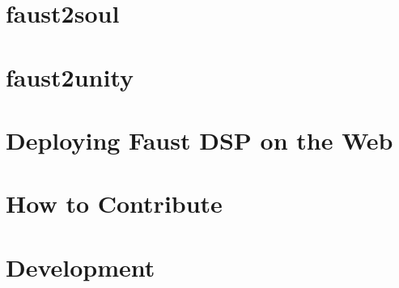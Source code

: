 \let\mypdfximage\pdfximage\def\pdfximage{\immediate\mypdfximage}\documentclass[twoside]{book}
\newcommand{\+}{\discretionary{\mbox{\scriptsize$\hookleftarrow$}}{}{}}
\begin{document}
\chapter{faust2soul}
\label{md__c_1__users_fab_src__github_branches__neural_amp_modeler_plugin_i_plug2__dependencies__build_39cb87a85a361f4c5993f8dacba43324}

\chapter{faust2unity}
\label{md__c_1__users_fab_src__github_branches__neural_amp_modeler_plugin_i_plug2__dependencies__build_186c879abe1e60a5c1ce38c0ccdd1e10}

\chapter{Deploying Faust D\+SP on the Web}
\label{md__c_1__users_fab_src__github_branches__neural_amp_modeler_plugin_i_plug2__dependencies__build_74bf914fccf00dc79e50080911c423cc}

\chapter{How to Contribute}
\label{md__c_1__users_fab_src__github_branches__neural_amp_modeler_plugin_i_plug2__dependencies__build_9b2666f9b7b3cedfd14108e4f808ae87}

\chapter{Development}
\label{md__c_1__users_fab_src__github_branches__neural_amp_modeler_plugin_i_plug2__dependencies__build_69a10b7a4057acf47d3fe9e8054f3b5b}

\end{document}
